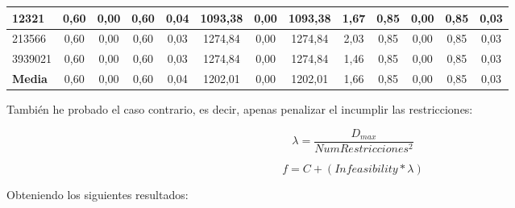 \documentclass[12pt, spanish]{article}
\begin{document}
\begin{table}[H]
\begin{adjustwidth}{-1.2cm}{-1.2cm}
\begin{tabular}{|l|c|c|c|c|c|c|c|c|c|c|c|c|}
12321                                                   & 0,60                         & 0,00                           & 0,60                      & 0,04                   & 1093,38                      & 0,00                           & 1093,38                   & 1,67                   & 0,85                         & 0,00                           & 0,85                      & 0,03                   \\ \hline
213566                                                  & 0,60                         & 0,00                           & 0,60                      & 0,03                   & 1274,84                      & 0,00                           & 1274,84                   & 2,03                   & 0,85                         & 0,00                           & 0,85                      & 0,03                   \\ \hline
3939021                                                 & 0,60                         & 0,00                           & 0,60                      & 0,03                   & 1274,84                      & 0,00                           & 1274,84                   & 1,46                   & 0,85                         & 0,00                           & 0,85                      & 0,03                   \\ \hline
\textbf{Media}                                          & 0,60                         & 0,00                           & 0,60                      & 0,04                   & 1202,01                      & 0,00                           & 1202,01                   & 1,66                   & 0,85                         & 0,00                           & 0,85                      & 0,03                   \\ \hline
\end{tabular}
\end{adjustwidth}

\end{table}

\newpage

También he probado el caso contrario, es decir, apenas penalizar el incumplir las restricciones: 

$$ \lambda = \frac{D_{max}}{NumRestricciones^2} $$ 

$$ f = C + (\textit{Infeasibility} * \lambda) $$ 

Obteniendo los siguientes resultados:
\end{document}
